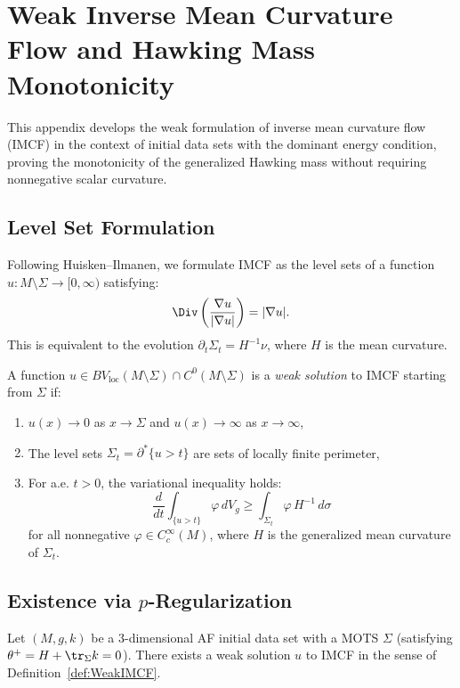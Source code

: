 \section{Weak Inverse Mean Curvature Flow and Hawking Mass Monotonicity}
\label{app:WeakIMCF}

This appendix develops the weak formulation of inverse mean curvature flow (IMCF) in the context of initial data sets with the dominant energy condition, proving the monotonicity of the generalized Hawking mass without requiring nonnegative scalar curvature.

\subsection{Level Set Formulation}
Following Huisken--Ilmanen, we formulate IMCF as the level sets of a function $u: M \setminus \Sigma \to [0, \infty)$ satisfying:
\begin{equation}\label{eq:LevelSetIMCF}
    \Div\left( \frac{\nabla u}{|\nabla u|} \right) = |\nabla u|.
\end{equation}
This is equivalent to the evolution $\partial_t \Sigma_t = H^{-1} \nu$, where $H$ is the mean curvature.

\begin{definition}\label{def:WeakIMCF}
A function $u \in BV_{\mathrm{loc}}(M \setminus \Sigma) \cap C^0(M \setminus \Sigma)$ is a \emph{weak solution} to IMCF starting from $\Sigma$ if:
\begin{enumerate}
    \item $u(x) \to 0$ as $x \to \Sigma$ and $u(x) \to \infty$ as $x \to \infty$,
    \item The level sets $\Sigma_t = \partial^* \{u > t\}$ are sets of locally finite perimeter,
    \item For a.e. $t > 0$, the variational inequality holds:
    \begin{equation}\label{eq:WeakIMCFVar}
        \frac{d}{dt} \int_{\{u > t\}} \varphi \, dV_g \ge \int_{\Sigma_t} \varphi \, H^{-1} \, d\sigma
    \end{equation}
    for all nonnegative $\varphi \in C^\infty_c(M)$, where $H$ is the generalized mean curvature of $\Sigma_t$.
\end{enumerate}
\end{definition}

\subsection{Existence via \texorpdfstring{$p$}{p}-Regularization}
\begin{theorem}\label{thm:ExistenceWeakIMCF}
Let $(M, g, k)$ be a 3-dimensional AF initial data set with a MOTS $\Sigma$ (satisfying $\theta^+ = H + \tr_\Sigma k = 0$). There exists a weak solution $u$ to IMCF in the sense of Definition~\ref{def:WeakIMCF}.
\end{theorem}

